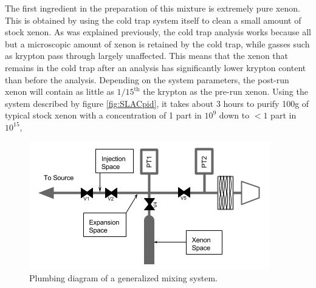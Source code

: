 \documentclass[12pt]{article}
\begin{document}
The first ingredient in the preparation of this mixture is extremely pure xenon. This is obtained by using the cold trap system itself to clean a small amount of stock xenon. As was explained previously, the cold trap analysis works because all but a microscopic amount of xenon is retained by the cold trap, while gasses such as krypton pass through largely unaffected. This means that the xenon that remains in the cold trap after an analysis has significantly lower krypton content than before the analysis. Depending on the system parameters, the post-run xenon will contain as little as $1/15^{\textrm{th}}$ the krypton as the pre-run xenon. Using the system described by figure \ref{fig:SLACpid}, it takes about 3 hours to purify 100g of typical stock xenon with a concentration of 1 part in $10^{9}$ down to $< 1$ part in $10^{15}$, 
\begin{figure}[h!]
  \includegraphics[width=\linewidth]{Figures/Mixing_diagram.png}
  \caption{Plumbing diagram of a generalized mixing system. }
  \label{fig:mixpid}
\end{figure}
\end{document}
